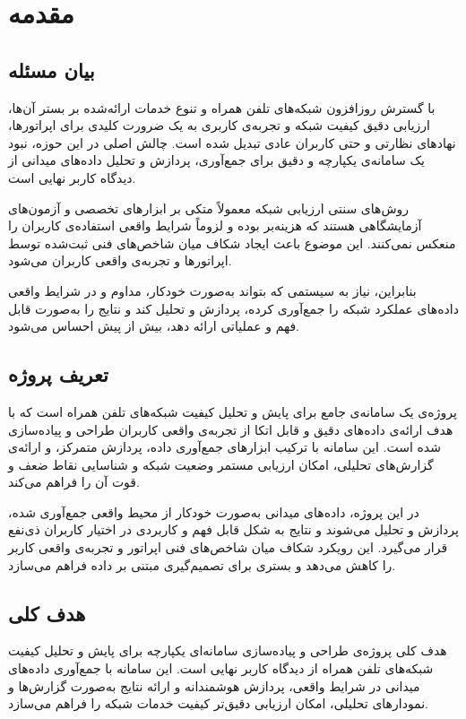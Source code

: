 \chapter{مقدمه} 
\section{بیان مسئله}

با گسترش روزافزون شبکه‌های تلفن همراه و تنوع خدمات ارائه‌شده بر بستر آن‌ها، ارزیابی دقیق کیفیت شبکه و تجربه‌ی کاربری به یک ضرورت کلیدی برای اپراتورها، نهادهای نظارتی و حتی کاربران عادی تبدیل شده است. چالش اصلی در این حوزه، نبود یک سامانه‌ی یکپارچه و دقیق برای جمع‌آوری، پردازش و تحلیل داده‌های میدانی از دیدگاه کاربر نهایی است.  

روش‌های سنتی ارزیابی شبکه معمولاً متکی بر ابزارهای تخصصی و آزمون‌های آزمایشگاهی هستند که هزینه‌بر بوده و لزوماً شرایط واقعی استفاده‌ی کاربران را منعکس نمی‌کنند. این موضوع باعث ایجاد شکاف میان شاخص‌های فنی ثبت‌شده توسط اپراتورها و تجربه‌ی واقعی کاربران می‌شود.  

بنابراین، نیاز به سیستمی که بتواند به‌صورت خودکار، مداوم و در شرایط واقعی داده‌های عملکرد شبکه را جمع‌آوری کرده، پردازش و تحلیل کند و نتایج را به‌صورت قابل فهم و عملیاتی ارائه دهد، بیش از پیش احساس می‌شود.


\section{تعریف پروژه}

پروژه‌ی  یک سامانه‌ی جامع برای پایش و تحلیل کیفیت شبکه‌های تلفن همراه است که با هدف ارائه‌ی داده‌های دقیق و قابل اتکا از تجربه‌ی واقعی کاربران طراحی و پیاده‌سازی شده است. این سامانه با ترکیب ابزارهای جمع‌آوری داده، پردازش متمرکز، و ارائه‌ی گزارش‌های تحلیلی، امکان ارزیابی مستمر وضعیت شبکه و شناسایی نقاط ضعف و قوت آن را فراهم می‌کند.  

در این پروژه، داده‌های میدانی به‌صورت خودکار از محیط واقعی جمع‌آوری شده، پردازش و تحلیل می‌شوند و نتایج به شکل قابل فهم و کاربردی در اختیار کاربران ذی‌نفع قرار می‌گیرد. این رویکرد شکاف میان شاخص‌های فنی اپراتور و تجربه‌ی واقعی کاربر را کاهش می‌دهد و بستری برای تصمیم‌گیری مبتنی بر داده فراهم می‌سازد.

\section{هدف کلی}

هدف کلی پروژه‌ی  طراحی و پیاده‌سازی سامانه‌ای یکپارچه برای پایش و تحلیل کیفیت شبکه‌های تلفن همراه از دیدگاه کاربر نهایی است. این سامانه با جمع‌آوری داده‌های میدانی در شرایط واقعی، پردازش هوشمندانه و ارائه نتایج به‌صورت گزارش‌ها و نمودارهای تحلیلی، امکان ارزیابی دقیق‌تر کیفیت خدمات شبکه را فراهم می‌سازد.


